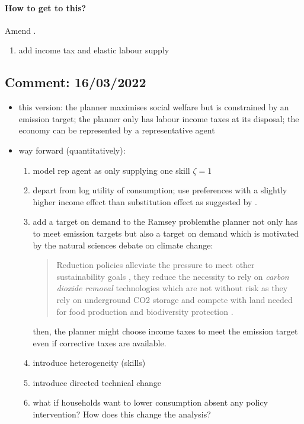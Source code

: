 \paragraph{How to get to this?}
\ar Amend \cite{Fried2018ClimateAnalysis}. 
\begin{enumerate}
\item add income tax and elastic labour supply
\end{enumerate}
\subsection*{Comment: 16/03/2022}
\begin{itemize}
	\item this version: the planner maximises social welfare but is constrained by an emission target; the planner only has labour income taxes at its disposal; the economy can be represented by a representative agent
	\item way forward (quantitatively):
	\begin{enumerate}
		\item model rep agent as only supplying one skill \ar $\zeta=1$
			\item depart from log utility of consumption; use preferences with a slightly higher income effect than substitution effect as suggested by \cite{Boppart2019labourPerspectiveb}.
		\item  add a target on demand to the Ramsey problem\ar the planner not only has to meet emission targets but also a target on demand which is motivated by the natural sciences debate on climate change: 
		\begin{quote}Reduction policies alleviate the pressure to meet other sustainability goals \citep{Bertram2018TargetedScenarios}, they reduce the necessity to rely on \textit{carbon dioxide removal} technologies which are not without risk as they rely on  underground CO2 storage and compete with land needed for food production and biodiversity protection \citep{VanVuuren2018AlternativeTechnologies}.
		\end{quote}
	then, the planner might choose income taxes to meet the emission target even if corrective taxes are available.

		\item  introduce heterogeneity  (skills) 
		\item  introduce directed technical change 
		\item what if households want to lower consumption absent any policy intervention? How does this change the analysis?
	\end{enumerate}
	
\end{itemize}

